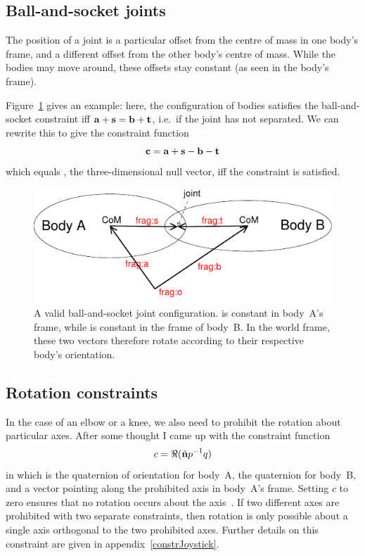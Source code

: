 \subsection{Ball-and-socket joints}

The position of a joint is a particular offset from the centre of mass in one body's frame, and a
different offset from the other body's centre of mass. While the bodies may move around, these
offsets stay constant (as seen in the body's frame).

Figure~\ref{ballAndSocketFigure} gives an example: here, the configuration of bodies satisfies the
ball-and-socket constraint iff $\ve{a}+\ve{s} = \ve{b}+\ve{t}$, i.e.\ if the joint has not
separated. We can rewrite this to give the constraint function
\begin{equation}
\ve{c} = \ve{a} + \ve{s} - \ve{b} - \ve{t}
\end{equation}
which equals , the three-dimensional null vector, iff the constraint is satisfied.

\begin{figure}
\centerline{\includegraphics{figures/joint2}}
\caption[]{A valid ball-and-socket joint configuration.  is constant in body~A's frame,
    while  is constant in the frame of body~B. In the world frame, these two vectors
    therefore rotate according to their respective body's orientation.\label{ballAndSocketFigure}}
\end{figure}

\subsection{Rotation constraints\label{rotationConstraints}}

In the case of an elbow or a knee, we also need to prohibit the rotation about particular axes.
After some thought I came up with the constraint function
\begin{equation}\label{rotationConstraintEqn}
c = \Re(\tilde{\ve{n}}\q{p}^{-1}\q{q})
\end{equation}
in which  is the quaternion of orientation for body~A,  the quaternion for body~B, and
 a vector pointing along the prohibited axis in body~A's frame. Setting $c$ to zero ensures
that no rotation occurs about the axis~. If two different axes are prohibited with two
separate constraints, then rotation is only possible about a single axis orthogonal to the two
prohibited axes. Further details on this constraint are given in appendix~\ref{constrJoystick}.

